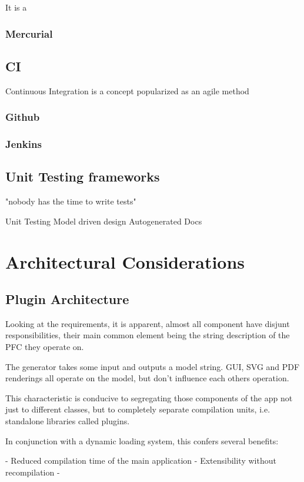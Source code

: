 It is a  
\subsubsection{Mercurial}

\subsection{CI}
Continuous Integration is a concept popularized as an \term agile method
\subsubsection{Github}

\subsubsection{Jenkins}


\subsection{Unit Testing frameworks}

"nobody has the time to write tests"

Unit Testing
Model driven design
Autogenerated Docs
\section{Architectural Considerations}

\subsection{Plugin Architecture}
Looking at the requirements, it is apparent, almost all component have disjunt responsibilities, their main common element being the string description of the PFC they operate on.

The  generator takes some input and outputs a model string. GUI, SVG and PDF renderings all operate on the model, but don't influence each others operation.

This characteristic is conducive to segregating those components of the app not just to different classes, but to completely separate compilation units, i.e. standalone libraries called plugins.

In conjunction with a dynamic loading system, this confers several benefits:

- Reduced compilation time of the main application
- Extensibility without recompilation
- 

